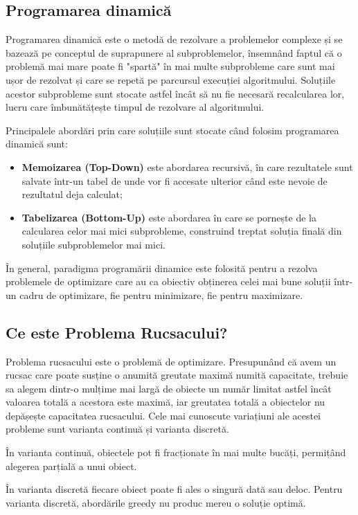 \begin{sloppypar}
\subsection*{Programarea dinamică}
Programarea dinamică este o metodă de rezolvare a problemelor complexe și se bazează pe conceptul de suprapunere al subproblemelor, însemnând faptul că o problemă mai mare poate fi "spartă" în mai multe subprobleme care sunt mai ușor de rezolvat și care se repetă pe parcursul execuției algoritmului. 
Soluțiile acestor subprobleme sunt stocate astfel încât să nu fie necesară recalcularea lor, lucru care îmbunătățește timpul de rezolvare al  algoritmului. \par 
Principalele abordări prin care soluțiile sunt stocate când folosim programarea dinamică sunt:
\begin{itemize}
     \item \textbf{Memoizarea (Top-Down)} este abordarea recursivă, în care rezultatele sunt salvate într-un tabel de unde vor fi accesate ulterior când este nevoie de rezultatul deja calculat;
     \item \textbf{Tabelizarea (Bottom-Up)} este abordarea în care se pornește de la calcularea celor mai mici subprobleme, construind treptat soluția finală din soluțiile subproblemelor mai mici.
\end{itemize} \par
În general, paradigma programării dinamice este folosită pentru a rezolva problemele de optimizare care au ca obiectiv obținerea celei mai bune soluții într-un cadru de optimizare, fie pentru minimizare, fie pentru maximizare. \par


\subsection*{Ce este Problema Rucsacului?}
Problema rucsacului este o problemă de optimizare. Presupunând că avem un rucsac care poate susține o anumită greutate maximă numită capacitate, trebuie sa alegem dintr-o mulțime mai largă de obiecte un număr limitat  astfel încât valoarea totală a acestora este maximă, iar greutatea totală a obiectelor nu depășește capacitatea rucsacului. Cele mai cunoscute variațiuni ale acestei probleme sunt varianta continuă și varianta discretă. \par 
În varianta continuă, obiectele pot fi fracționate în mai multe bucăți, permițând alegerea parțială a unui obiect. \par
În varianta discretă fiecare obiect poate fi ales o singură dată sau deloc. Pentru varianta discretă, abordările greedy nu produc mereu o soluție optimă. 


\end{sloppypar}
